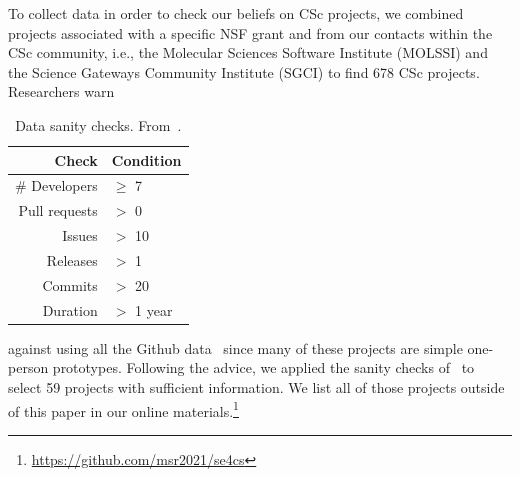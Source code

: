 \documentclass[conference,10pt]{IEEEtran}
\begin{document}
 

 
 

 

To collect data in order to check our beliefs on CSc projects, we combined projects associated with a specific NSF grant and from our contacts within the CSc community, i.e., the Molecular Sciences Software Institute (MOLSSI) and the Science Gateways Community Institute (SGCI) to find
678 CSc projects. Researchers
warn  \begin{table}
\vspace{-15pt}
\centering
\caption{Data sanity checks. From~\cite{Kalliamvakou:2014}.}\label{tbl:sanity}
\small
\begin{tabular}{r|l}
 Check   & Condition    \\\hline
 \# Developers & $\geq$ 7 \\
 Pull requests  & $>$ 0 \\
Issues & $>$ 10 \\
Releases &  $>$ 1 \\
Commits & $>$ 20 \\
Duration  & $>$ 1 year 
\end{tabular}%
\vspace{-10pt}
\end{table} against using all the Github data~\cite{bird09promise,agrawal2018we, eirini15promise, munaiah17curating} since
many of these projects are simple one-person prototypes. 
Following  the advice, we applied the sanity checks of~
to select 59 projects with sufficient information. We list all of those projects outside of this paper in our online materials.\footnote{\vspace{-20pt}\url{https://github.com/msr2021/se4cs}}
\end{document}
